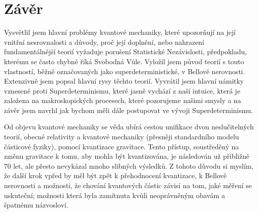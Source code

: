 \section*{Závěr}
\label{sec:conc}

Vysvětlil jsem hlavní problémy kvantové mechaniky, které upozorňují na její vnitřní nesrovnalosti a důvody, proč její doplnění, nebo nahrazení fundamentálnější teorií vyžaduje porušení Statistické Nezávislosti, předpokladu, kterému se často chybně říká Svobodná Vůle. Vyložil jsem původ teorií s touto vlastností, běžně označovaných jako superdeterministické, v Bellově nerovnosti. Extenzivně jsem popsal hlavní rysy těchto teorií. Vyvrátil jsem hlavní námitky vznesené proti Superdeterminismu, které jasně vychází z naší intuice, která je založena na makroskopických procesech, které pozorujeme našimi smysly a na závěr jsem navrhl jak bychom měli dále postupovat ve vývoji Superdeterminismu.

Od objevu kvantové mechaniky se věda ubírá cestou unifikace dvou neslučitelných teorií, obecné relativity a kvantové mechaniky (přesněji standardního modelu částicové fyziky), pomocí kvantizace gravitace. Tento přístup, soustředěný na změnu gravitace k tomu, aby mohla být kvantizována, je následován už přibližně 70 let, ale přesto nevykázal mnoho slibných výsledků. Z tohoto důvodu si myslím, že další krok vpřed by měl být zpět k přehodnocení kvantizace, k Bellově nerovnosti a možnosti, že chování kvantových částic závisí na tom, jaké měření se uskuteční; možnosti která byla zamítnuta kvůli neoprávněným obavám a špatnému názvosloví.